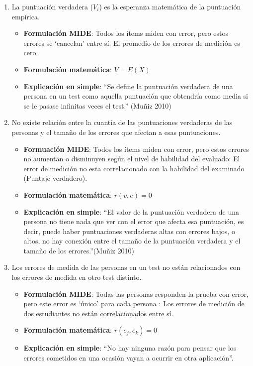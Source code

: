 \documentclass[
  letterpaper,
  DIV=11,
  numbers=noendperiod]{scrreprt}
\begin{document}
\begin{enumerate}
\def\labelenumi{\arabic{enumi}.}
\item
  La puntuación verdadera (\(V_i\)) es la esperanza matemática de la
  puntuación empírica.

  \begin{itemize}
  \item
    \textbf{Formulación MIDE}: Todos los ítems miden con error, pero
    estos errores se `cancelan' entre sí. El promedio de los errores de
    medición es cero.
  \item
    \textbf{Formulación matemática}: \(V = E(X)\)
  \item
    \textbf{Explicación en simple}: ``Se define la puntuación verdadera
    de una persona en un test como aquella puntuación que obtendría como
    media si se le pasase infinitas veces el test.'' (Muñiz 2010)
  \end{itemize}
\item
  No existe relación entre la cuantía de las puntuaciones verdaderas de
  las personas y el tamaño de los errores que afectan a esas
  puntuaciones.

  \begin{itemize}
  \item
    \textbf{Formuación MIDE}: Todos los ítems miden con error, pero
    estos errores no aumentan o disminuyen según el nivel de habilidad
    del evaluado: El error de medición no esta correlacionado con la
    habilidad del examinado (Puntaje verdadero).
  \item
    \textbf{Formulación matemática}: \(r(v,e) = 0\)
  \item
    \textbf{Explicación en simple}: ``El valor de la puntuación
    verdadera de una persona no tiene nada que ver con el error que
    afecta esa puntuación, es decir, puede haber puntuaciones verdaderas
    altas con errores bajos, o altos, no hay conexión entre el tamaño de
    la puntuación verdadera y el tamaño de los errores.''(Muñiz 2010)
  \end{itemize}
\item
  Los errores de medida de las personas en un test no están relacionados
  con los errores de medida en otro test distinto.

  \begin{itemize}
  \item
    \textbf{Formulación MIDE}: Todas las personas responden la prueba
    con error, pero este error es `único' para cada persona : Los
    errores de medición de dos estudiantes no están correlacionados
    entre sí.
  \item
    \textbf{Formulación matemática}: \(r(e_{j}, e_{k}) = 0\)
  \item
    \textbf{Explicación en simple}: ``No hay ninguna razón para pensar
    que los errores cometidos en una ocasión vayan a ocurrir en otra
    aplicación''.
  \end{itemize}
\end{enumerate}
\end{document}
